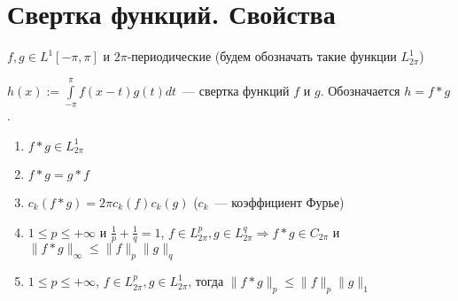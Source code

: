 \section{Свертка функций. Свойства}

\begin{definition}
    $f, g \in L^1[-\pi, \pi]$ и $2\pi$-периодические (будем обозначать такие функции $L^1_{2\pi}$)
    
    $h(x) := \int\limits_{-\pi}^\pi f(x - t)g(t)dt$~--- свертка функций $f$ и $g$. Обозначается $h = f \ast g$.
\end{definition}

\begin{properties}
    \leavevmode
    \begin{enumerate}
        \item $f \ast g \in L^1_{2\pi}$
        \item $f \ast g = g \ast f$
        \item $c_k(f\ast g) = 2\pi c_k(f) c_k(g)$ ($c_k$~--- коэффициент Фурье)
        \item $1 \leq p \leq +\infty$ и $\frac{1}{p} + \frac{1}{q} = 1$, $f \in L^p_{2\pi}, g \in L^q_{2\pi} \Rightarrow f \ast g \in C_{2\pi}$ и $\|f \ast g\|_\infty \leq \|f\|_p\|g\|_q$
        \item $1 \leq p \leq +\infty$, $f \in L^p_{2\pi}, g \in L^1_{2\pi}$, тогда $\|f \ast g\|_p \leq \|f\|_p \|g\|_1$
    \end{enumerate}
\end{properties}

